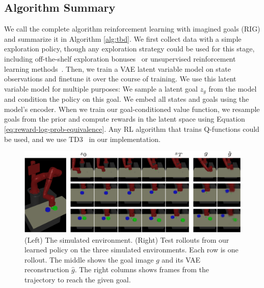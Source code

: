 \documentclass{article}
\begin{document}
\subsection{Algorithm Summary}
\label{sec:alg_summary}

We call the complete algorithm reinforcement learning with imagined goals (RIG) and summarize it in Algorithm \ref{alg:tbd}.
We first collect data with a simple exploration policy, though any exploration strategy could be used for this stage, including off-the-shelf exploration bonuses~\cite{pathak2017curiosity, bellemare2016unifying} or unsupervised reinforcement learning methods~\cite{eysenbach2018diayn, florensa2017stochastic}.
Then, we train a VAE latent variable model on state observations and finetune it over the course of training.
We use this latent variable model for multiple purposes:
We sample a latent goal $z_g$ from the model and condition the policy on this goal.
We embed all states and goals using the model's encoder.
When we train our goal-conditioned value function, we resample goals from the prior and compute rewards in the latent space using Equation \eqref{eq:reward-log-prob-equivalence}.
Any RL algorithm that trains Q-functions could be used, and we use TD3~\citep{fujimoto2018td3} in our implementation.

\begin{figure}
    \centering
    \includegraphics[width=0.99\linewidth]{img/nips18_fig_rollouts-crop.pdf}
    \caption{(Left) The simulated environment. (Right) Test rollouts from our learned policy on the three simulated environments. Each row is one rollout. The middle shows the goal image $g$ and its VAE reconstruction $\hat g$. The right columns shows frames from the trajectory to reach the given goal.}
    \vspace{-0.1in}
    \label{fig:sim_screenshot}
\end{figure}
\end{document}
